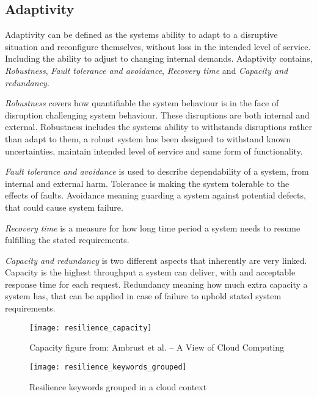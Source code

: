 \subsection{Adaptivity} 
Adaptivity can be defined as the systems ability to adapt to a disruptive situation and reconfigure themselves, without loss in the intended level of service. Including the ability to adjust to changing internal demands\cite{reed2009methodology}. Adaptivity contains, \textit{Robustness}, \textit{Fault tolerance and avoidance}, \textit{Recovery time} and \textit{Capacity and redundancy}.


\textit{Robustness} covers how quantifiable the system behaviour is in the face of disruption challenging system behaviour\cite[p. 10]{sterbenz2010resilience}. These disruptions are both internal and external\cite{omer2013resilience}. Robustness includes the systems ability to withstands disruptions rather than adapt to them, a robust system has been designed to withstand known uncertainties, maintain intended level of service and same form of functionality.

\textit{Fault tolerance and avoidance} is used to describe dependability of a system, from internal and external harm. Tolerance is making the system tolerable to the effects of faults. Avoidance meaning guarding a system against potential defects, that could cause system failure\cite{strigini2012fault}.


\textit{Recovery time} is a measure for how long time period a system needs to resume fulfilling the stated requirements.


\textit{Capacity and redundancy} is two different aspects that inherently are very linked. Capacity is the highest throughput a system can deliver, with and acceptable response time for each request\cite[p. 136]{nygard2007release}. Redundancy meaning how much extra capacity a system has, that can be applied in case of failure to uphold stated system requirements.
\begin{figure}[!htb]
  \texttt{[image: resilience\_capacity]}  
  \caption{Capacity figure from: Ambrust et al. – A View of Cloud Computing   }
  \label{fig:resilience_keywords_grouped}
\end{figure}

\begin{figure}[!htb]
  \texttt{[image: resilience\_keywords\_grouped]}  
  \caption{Resilience keywords grouped in a cloud context}
  \label{fig:resilience_keywords_grouped}
\end{figure}

